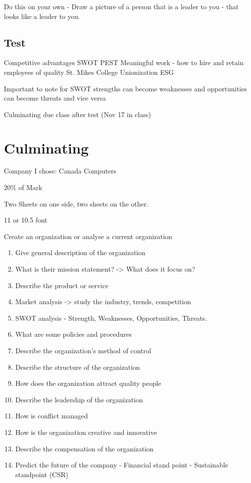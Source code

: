 \documentclass[11pt]{article}
\begin{document}
Do this on your own - Draw a picture of a person that is a leader to you - that looks like a leader to you.



\subsection{Test}
Competitive advantages
SWOT
PEST
Meaningful work - how to hire and retain employees of quality
St. Mikes College
Unionization
ESG

Important to note for SWOT strengths can become weaknesses and opportunities can become threats and vice versa

Culminating due class after test (Nov 17 in class)





\section{Culminating}
Company I chose: Canada Computers

20\% of Mark

Two Sheets on one side, two sheets on the other.

11 or 10.5 font

Create an organization or analyse a current organization

\begin{enumerate}
    \item Give general description of the organization
    \item What is their mission statement? -> What does it focus on?
    \item Describe the product or service
    \item Market analysis -> study the industry, trends, competition
    \item SWOT analysis - Strength, Weaknesses, Opportunities, Threats.
    \item What are some policies and procedures
    \item Describe the organization's method of control
    \item Describe the structure of the organization
    \item How does the organization attract quality people
    \item Describe the leadership of the organization
    \item How is conflict managed
    \item How is the organization creative and innovative
    \item Describe the compensation of the organization
    \item Predict the future of the company - Financial stand point - Sustainable standpoint (CSR)
\end{enumerate}
\end{document}
